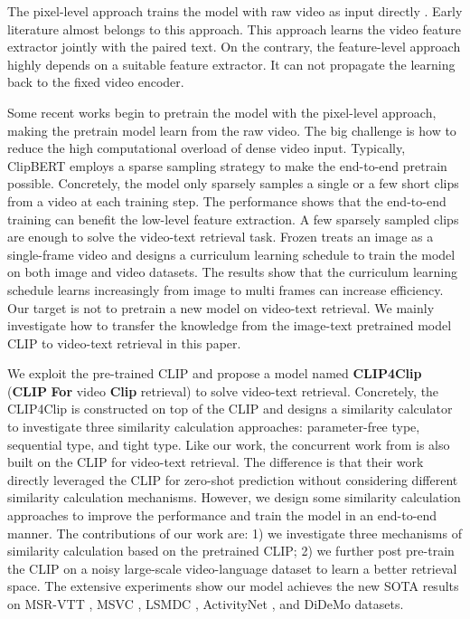 \documentclass[11pt]{article}
\begin{document}
	The pixel-level approach trains the model with raw video as input directly \cite{Torabi2016Learning,kiros2014unifying,Yu2016Video,Kaufman2017Temporal,Yu2017End,yu2018joint}. Early literature almost belongs to this approach. This approach learns the video feature extractor jointly with the paired text. On the contrary, the feature-level approach highly depends on a suitable feature extractor. It can not propagate the learning back to the fixed video encoder.

	Some recent works begin to pretrain the model with the pixel-level approach, making the pretrain model learn from the raw video. The big challenge is how to reduce the high computational overload of dense video input. Typically, ClipBERT \cite{lei2021less} employs a sparse sampling strategy to make the end-to-end pretrain possible. Concretely, the model only sparsely samples a single or a few short clips from a video at each training step. The performance shows that the end-to-end training can benefit the low-level feature extraction. A few sparsely sampled clips are enough to solve the video-text retrieval task. Frozen \cite{Bain2021Frozen} treats an image as a single-frame video and designs a curriculum learning schedule to train the model on both image and video datasets. The results show that the curriculum learning schedule learns increasingly from image to multi frames can increase efficiency. Our target is not to pretrain a new model on video-text retrieval. We mainly investigate how to transfer the knowledge from the image-text pretrained model CLIP \cite{radford2021learning} to video-text retrieval in this paper.

	We exploit the pre-trained CLIP and propose a model named \textbf{CLIP4Clip} (\textbf{CLIP} \textbf{For} video \textbf{Clip} retrieval) to solve video-text retrieval. Concretely, the CLIP4Clip is constructed on top of the CLIP and designs a similarity calculator to investigate three similarity calculation approaches: parameter-free type, sequential type, and tight type. Like our work, the concurrent work from \citet{PortilloQuintero2021} is also built on the CLIP for video-text retrieval. The difference is that their work directly leveraged the CLIP for zero-shot prediction without considering different similarity calculation mechanisms. However, we design some similarity calculation approaches to improve the performance and train the model in an end-to-end manner. The contributions of our work are: 1) we investigate three mechanisms of similarity calculation based on the pretrained CLIP; 2) we further post pre-train the CLIP on a noisy large-scale video-language dataset to learn a better retrieval space. The extensive experiments show our model achieves the new SOTA results on MSR-VTT \cite{xu2016msr}, MSVC \cite{chen2011collecting}, LSMDC \cite{Rohrbach2015LSMDC}, ActivityNet \cite{krishna2017dense}, and DiDeMo \cite{hendricks17iccv} datasets.
\end{document}
